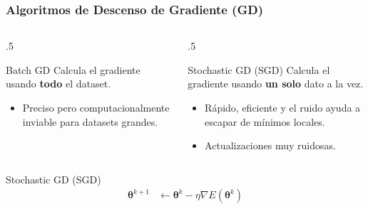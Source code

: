 \documentclass[aspectratio=169, 10pt]{beamer}
\begin{document}
\begin{frame}
	\frametitle{Algoritmos de Descenso de Gradiente (GD)}
	
	\begin{columns}[t]
		\begin{column}{.5\textwidth}
			\begin{block}{Batch GD}
				Calcula el gradiente usando \textbf{todo} el dataset.
				\begin{itemize}
					\item[-] Preciso pero computacionalmente inviable para datasets grandes.
				\end{itemize}
			\end{block}
		\end{column}
		\begin{column}{.5\textwidth}
			\begin{block}{Stochastic GD (SGD)}
				Calcula el gradiente usando \textbf{un solo} dato a la vez.
				\begin{itemize}
					\item[+] Rápido, eficiente y el ruido ayuda a escapar de mínimos locales.
					\item[-] Actualizaciones muy ruidosas.
				\end{itemize}
			\end{block}
		\end{column}
		
	\end{columns}
	\begin{alertblock}{Stochastic GD (SGD)}
	\begin{align*}
		\mathbf{\theta}^{k+1}&\leftarrow \mathbf{\theta}^{k}-\eta \nabla E(\mathbf{\theta}^{k})
	\end{align*}
	\end{alertblock}
\end{frame}
\end{document}
